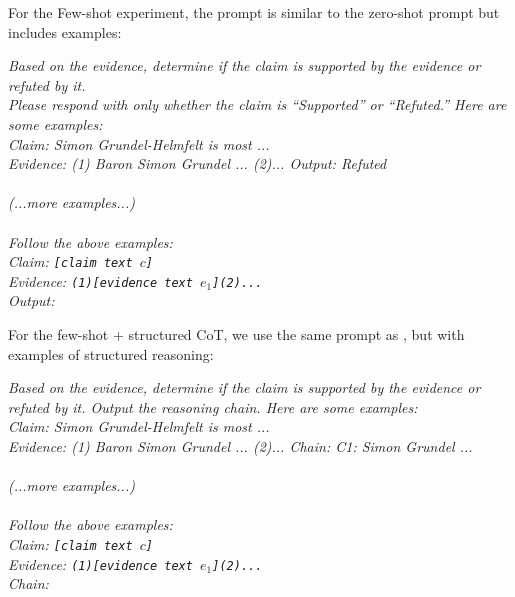 For the Few-shot experiment, the prompt is similar to the zero-shot prompt but includes examples:
\begin{mybox}
\textit{Based on the evidence, determine if the claim is supported by the evidence or refuted by it.\\
Please respond with only whether the claim is ``Supported'' or ``Refuted.'' Here are some examples:\\ 
Claim: Simon Grundel-Helmfelt is most ...\\
Evidence: (1) Baron Simon Grundel ... (2)...
Output: Refuted\\
\\(...more examples...)\\\\
Follow the above examples:\\
Claim: \texttt{[claim text $c$]}\\
Evidence: \texttt{(1)[evidence text $e_1$](2)...}\\
Output:
}
\end{mybox}

For the few-shot + structured CoT, we use the same prompt as \themodel, but with examples of structured reasoning:
\begin{mybox}
\textit{Based on the evidence, determine if the claim is supported by the evidence or refuted by it. Output the reasoning chain. Here are some examples:\\ 
Claim: Simon Grundel-Helmfelt is most ...\\
Evidence: (1) Baron Simon Grundel ... (2)...
Chain: C1: Simon Grundel ... \\
\\(...more examples...)\\\\
Follow the above examples:\\
Claim: \texttt{[claim text $c$]}\\
Evidence: \texttt{(1)[evidence text $e_1$](2)...}\\
Chain:
}
\end{mybox}

